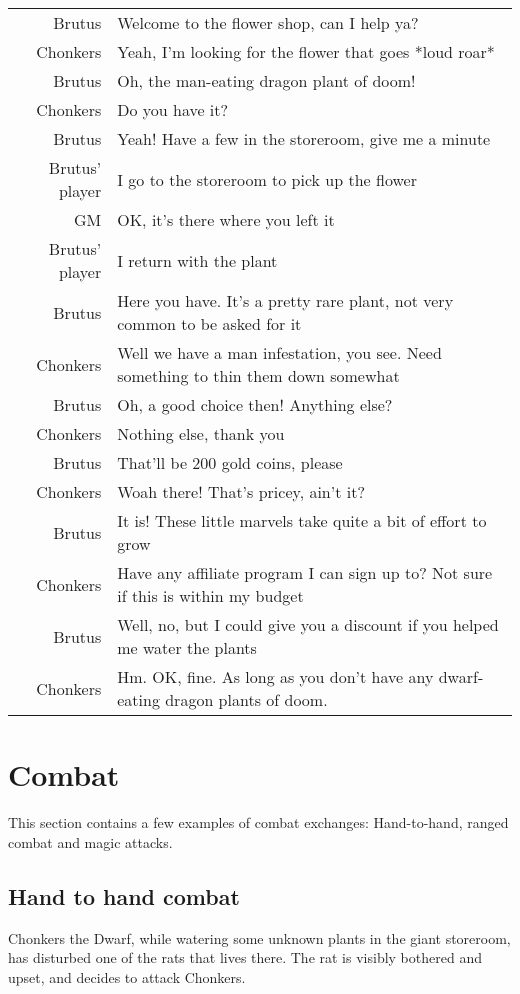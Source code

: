 \begin{tabular}{rl}
Brutus& Welcome to the flower shop, can I help ya?\\
Chonkers& Yeah, I'm looking for the flower that goes *loud roar*\\
Brutus& Oh, the man-eating dragon plant of doom!\\
Chonkers& Do you have it?\\
Brutus& Yeah! Have a few in the storeroom, give me a minute\\
Brutus' player& I go to the storeroom to pick up the flower\\
GM& OK, it's there where you left it\\
Brutus' player& I return with the plant\\
Brutus& Here you have. It's a pretty rare plant, not very common to be asked for it\\
Chonkers& Well we have a man infestation, you see. Need something to thin them down somewhat\\
Brutus& Oh, a good choice then! Anything else?\\
Chonkers& Nothing else, thank you\\
Brutus& That'll be 200 gold coins, please\\
Chonkers& Woah there! That's pricey, ain't it?\\
Brutus& It is! These little marvels take quite a bit of effort to grow\\
Chonkers& Have any affiliate program I can sign up to? Not sure if this is within my budget\\
Brutus& Well, no, but I could give you a discount if you helped me water the plants\\
Chonkers& Hm. OK, fine. As long as you don't have any dwarf-eating dragon plants of doom.
\end{tabular}

\section{Combat}

This section contains a few examples of combat exchanges: Hand-to-hand, ranged combat and magic attacks. 

\subsection*{Hand to hand combat}

Chonkers the Dwarf, while watering some unknown plants in the giant storeroom, has disturbed one of the rats that lives there. The rat is visibly bothered and upset, and decides to attack Chonkers. 

